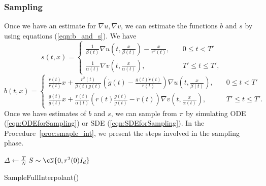 \subsubsection{Sampling}
Once we have an estimate for $\nabla u, \nabla v$, we can estimate the functions $b$ and $s$ by using equations (\ref{eqn:b_and_s}). We have
\begin{equation*}
    s(t,x) = \begin{cases}
        \frac{1}{\beta(t)}\nabla u(t,\frac{x}{\beta(t)})-\frac{x}{r^2(t)},\quad &0\le t<T'\\
        \frac{1}{\alpha(t)}\nabla v(t,\frac{x}{\alpha(t)}),\quad &T'\le t\le T',
    \end{cases}
\end{equation*}
\begin{equation*}
    b(t,x) = \begin{cases}
        \frac{\dot r(t)}{r(t)}x+\frac{r^2(t)}{\beta(t)g(t)}\left(\dot g(t)-\frac{g(t)\dot r(t)}{r(t)}\right)\nabla u(t,\frac{x}{\beta(t)}),\quad &0\le t<T'\\
        \frac{\dot g(t)}{g(t)}x+\frac{r(t)}{\alpha(t)}\left(r(t)\frac{\dot g(t)}{g(t)}-\dot r(t)\right)\nabla v(t,\frac{x}{\alpha(t)}),\quad &T'\le t\le T'.
    \end{cases}
\end{equation*} 
Once we have estimates of $b$ and $s$, we can sample from $\pi$ by simulating ODE (\ref{eqn:ODEforSampling}) or SDE (\ref{eqn:SDEforSampling}). In the Procedure~\ref{proc:smaple_int}, we present the steps involved in the sampling phase.

\begin{procedure}
\DontPrintSemicolon
$\Delta \gets \frac{T}{N}$\;
$S\sim\cN{0,r^2(0)I_d}$\;
	\caption{SampleFullInterpolant()}\label{proc:smaple_int}
\end{procedure}

